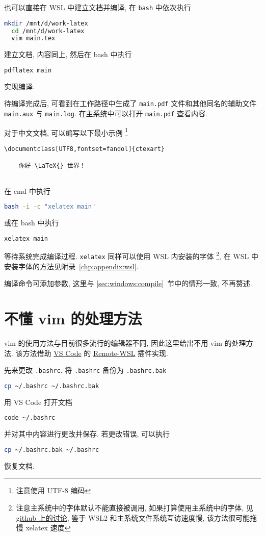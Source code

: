 也可以直接在 WSL 中建立文档并编译,
在 \texttt{bash} 中依次执行
\begin{lstlisting}[language=bash]
  mkdir /mnt/d/work-latex
  cd /mnt/d/work-latex
  vim main.tex
\end{lstlisting}
建立文档,
内容同上,
然后在 \textsf{bash} 中执行
\begin{lstlisting}[language=bash]
  pdflatex main
\end{lstlisting}
实现编译.

待编译完成后, 可看到在工作路径中生成了 \texttt{main.pdf}
文件和其他同名的辅助文件 \texttt{main.aux} 与 \texttt{main.log}.
在主系统中可以打开 \texttt{main.pdf} 查看内容.

对于中文文档,
可以编写以下最小示例%
\footnote{注意使用 UTF-8 编码}%
\begin{lstlisting}[language={[LaTeX]TeX}]
  \documentclass[UTF8,fontset=fandol]{ctexart}
  
    你好 \LaTeX{} 世界！
  
\end{lstlisting}
在 \textsf{cmd} 中执行
\begin{lstlisting}[language=bash]
  bash -i -c "xelatex main"
\end{lstlisting}
或在 \textsf{bash} 中执行
\begin{lstlisting}[language=bash]
  xelatex main
\end{lstlisting}
等待系统完成编译过程. 
\texttt{xelatex} 同样可以使用 WSL 内安装的字体%
\footnote{注意主系统中的字体默认不能直接被调用,
如果打算使用主系统中的字体,
见
\href{https://github.com/OsbertWang/install-latex-guide-zh-cn/issues/14}{github 上的讨论},
鉴于 WSL2 和主系统文件系统互访速度慢,
该方法很可能拖慢 xelatex 速度},
在 WSL 中安装字体的方法见附录~\ref{chp:appendix:wsl}.

编译命令可添加参数, 这里与 \ref{sec:windows:compile}~节中的情形一致, 不再赘述.

\section{不懂 \textsf{vim} 的处理方法}\label{sec:no-vim}

\textsf{vim} 的使用方法与目前很多流行的编辑器不同,
因此这里给出不用 \textsf{vim} 的处理方法.
该方法借助 \href{https://code.visualstudio.com/}{VS Code} 的 \href{https://marketplace.visualstudio.com/items?itemName=ms-vscode-remote.remote-wsl}{Remote-WSL} 插件实现.

先来更改 \texttt{.bashrc}.
将 \texttt{.bashrc} 备份为 \texttt{.bashrc.bak}
\begin{lstlisting}[language=bash]
  cp ~/.bashrc ~/.bashrc.bak
\end{lstlisting}
用 VS Code 打开文档
\begin{lstlisting}[language=bash]
  code ~/.bashrc
\end{lstlisting}
并对其中内容进行更改并保存.
若更改错误,
可以执行
\begin{lstlisting}[language=bash]
  cp ~/.bashrc.bak ~/.bashrc
\end{lstlisting}
恢复文档.

